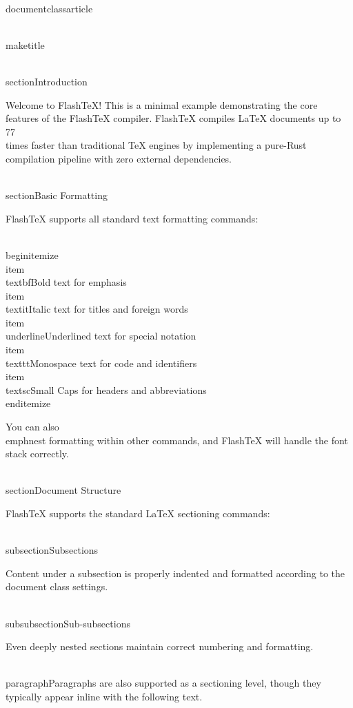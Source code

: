 \\documentclass{article}
\begin{document}
\\maketitle

\\section{Introduction}

Welcome to FlashTeX! This is a minimal example demonstrating the core features
of the FlashTeX compiler. FlashTeX compiles LaTeX documents up to 77\\times
faster than traditional TeX engines by implementing a pure-Rust compilation
pipeline with zero external dependencies.

\\section{Basic Formatting}

FlashTeX supports all standard text formatting commands:

\\begin{itemize}
  \\item \\textbf{Bold text} for emphasis
  \\item \\textit{Italic text} for titles and foreign words
  \\item \\underline{Underlined text} for special notation
  \\item \\texttt{Monospace text} for code and identifiers
  \\item \\textsc{Small Caps} for headers and abbreviations
\\end{itemize}

You can also \\emph{nest formatting} within other commands, and FlashTeX
will handle the font stack correctly.

\\section{Document Structure}

FlashTeX supports the standard LaTeX sectioning commands:

\\subsection{Subsections}

Content under a subsection is properly indented and formatted according to
the document class settings.

\\subsubsection{Sub-subsections}

Even deeply nested sections maintain correct numbering and formatting.

\\paragraph{Paragraphs} are also supported as a sectioning level, though
they typically appear inline with the following text.
\end{document}

